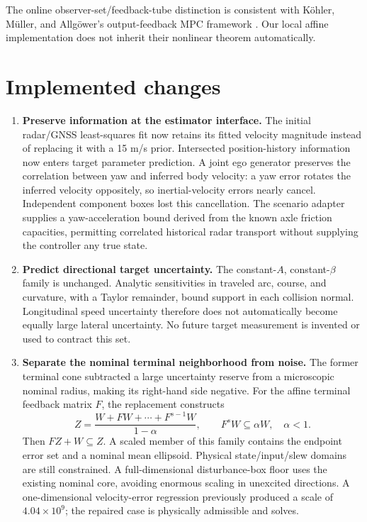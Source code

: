 \documentclass[11pt]{article}
\begin{document}
The online observer-set/feedback-tube distinction is consistent with
K\"ohler, M\"uller, and Allg\"ower's output-feedback MPC framework
\cite{Kohler}. Our local affine implementation does not inherit their
nonlinear theorem automatically.

\section{Implemented changes}
\begin{enumerate}[leftmargin=*,itemsep=3pt]
\item \textbf{Preserve information at the estimator interface.}
The initial radar/GNSS least-squares fit now retains its fitted velocity
magnitude instead of replacing it with a 15 m/s prior. Intersected
position-history information now enters target parameter prediction.
A joint ego generator preserves the correlation between yaw and inferred
body velocity: a yaw error rotates the inferred velocity oppositely, so
inertial-velocity errors nearly cancel. Independent component boxes lost
this cancellation. The scenario adapter supplies a yaw-acceleration bound
derived from the known axle friction capacities, permitting correlated
historical radar transport without supplying the controller any true state.

\item \textbf{Predict directional target uncertainty.}
The constant-$A$, constant-$\beta$ family is unchanged. Analytic sensitivities
in traveled arc, course, and curvature, with a Taylor remainder, bound
support in each collision normal. Longitudinal speed uncertainty therefore
does not automatically become equally large lateral uncertainty.
No future target measurement is invented or used to contract this set.

\item \textbf{Separate the nominal terminal neighborhood from noise.}
The former terminal cone subtracted a large uncertainty reserve from a
microscopic nominal radius, making its right-hand side negative.
For the affine terminal feedback matrix $F$, the replacement constructs
\[
 Z=\frac{W+FW+\cdots+F^{s-1}W}{1-\alpha},\qquad
 F^sW\subseteq\alpha W,\quad \alpha<1.
\]
Then $FZ+W\subseteq Z$. A scaled member of this family contains the endpoint
error set and a nominal mean ellipsoid. Physical state/input/slew domains
are still constrained. A full-dimensional disturbance-box floor uses the
existing nominal core, avoiding enormous scaling in unexcited directions.
A one-dimensional velocity-error regression previously produced a scale
of $4.04\times10^9$; the repaired case is physically admissible and solves.


\end{enumerate}
\end{document}
